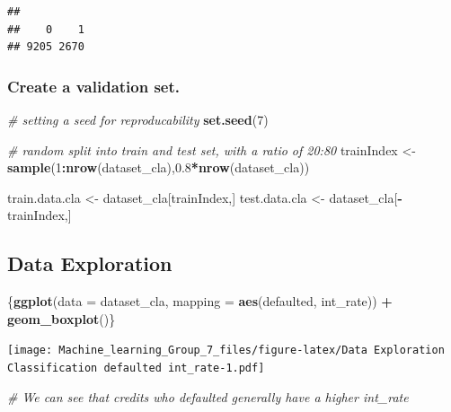 \documentclass[]{article}
\newenvironment{Shaded}{\begin{snugshade}}{\end{snugshade}}
\newcommand{\CommentTok}[1]{\textcolor[rgb]{0.56,0.35,0.01}{\textit{#1}}}
\newcommand{\DataTypeTok}[1]{\textcolor[rgb]{0.13,0.29,0.53}{#1}}
\newcommand{\DecValTok}[1]{\textcolor[rgb]{0.00,0.00,0.81}{#1}}
\newcommand{\FloatTok}[1]{\textcolor[rgb]{0.00,0.00,0.81}{#1}}
\newcommand{\KeywordTok}[1]{\textcolor[rgb]{0.13,0.29,0.53}{\textbf{#1}}}
\newcommand{\NormalTok}[1]{#1}
\newcommand{\OperatorTok}[1]{\textcolor[rgb]{0.81,0.36,0.00}{\textbf{#1}}}
\newcommand{\StringTok}[1]{\textcolor[rgb]{0.31,0.60,0.02}{#1}}
\begin{document}
\begin{verbatim}
## 
##    0    1 
## 9205 2670
\end{verbatim}

\hypertarget{create-a-validation-set.}{%
\subsubsection{Create a validation
set.}\label{create-a-validation-set.}}

\begin{Shaded}
\begin{Highlighting}[]
\CommentTok{# setting a seed for reproducability}
\KeywordTok{set.seed}\NormalTok{(}\DecValTok{7}\NormalTok{)}

\CommentTok{# random split into  train and test set, with a ratio of 20:80}
\NormalTok{trainIndex <-}\StringTok{ }\KeywordTok{sample}\NormalTok{(}\DecValTok{1}\OperatorTok{:}\KeywordTok{nrow}\NormalTok{(dataset_cla),}\FloatTok{0.8}\OperatorTok{*}\KeywordTok{nrow}\NormalTok{(dataset_cla))}

\NormalTok{train.data.cla <-}\StringTok{ }\NormalTok{dataset_cla[trainIndex,]}
\NormalTok{test.data.cla  <-}\StringTok{ }\NormalTok{dataset_cla[}\OperatorTok{-}\NormalTok{trainIndex,]}
\end{Highlighting}
\end{Shaded}

\hypertarget{data-exploration-1}{%
\subsection{Data Exploration}\label{data-exploration-1}}

\begin{Shaded}
\begin{Highlighting}[]
\NormalTok{\{}\KeywordTok{ggplot}\NormalTok{(}\DataTypeTok{data =}\NormalTok{ dataset_cla, }\DataTypeTok{mapping =} \KeywordTok{aes}\NormalTok{(defaulted, int_rate)) }\OperatorTok{+}
\StringTok{    }\KeywordTok{geom_boxplot}\NormalTok{()\}}
\end{Highlighting}
\end{Shaded}

\texttt{[image: Machine\_learning\_Group\_7\_files/figure-latex/Data Exploration Classification defaulted int\_rate-1.pdf]}

\begin{Shaded}
\begin{Highlighting}[]
\CommentTok{# We can see that credits who defaulted generally have a higher int_rate}
\end{Highlighting}
\end{Shaded}
\end{document}
